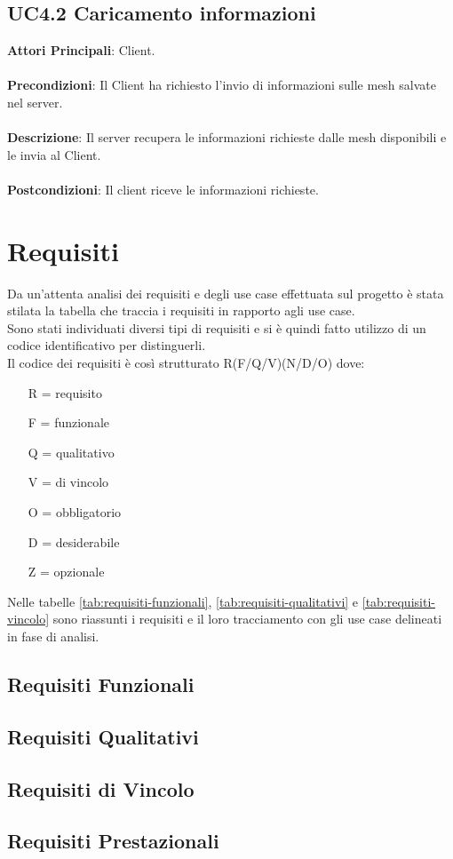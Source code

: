 \subsection{UC4.2 Caricamento informazioni}
\textbf{Attori Principali}: Client.
\\\\ \textbf{Precondizioni}: Il Client ha richiesto l'invio di informazioni sulle mesh salvate nel server.
\\\\ \textbf{Descrizione}: Il server recupera le informazioni richieste dalle mesh disponibili e le invia al Client.
\\\\ \textbf{Postcondizioni}: Il client riceve le informazioni richieste.


\section{Requisiti}

Da un'attenta analisi dei requisiti e degli use case effettuata sul progetto è stata stilata la tabella che traccia i requisiti in rapporto agli use case.\\
Sono stati individuati diversi tipi di requisiti e si è quindi fatto utilizzo di un codice identificativo per distinguerli.\\
Il codice dei requisiti è così strutturato R(F/Q/V)(N/D/O) dove:
\begin{enumerate}
	\item[R =] requisito
    \item[F =] funzionale
    \item[Q =] qualitativo
    \item[V =] di vincolo
    \item[O =] obbligatorio
    \item[D =] desiderabile
    \item[Z =] opzionale
\end{enumerate}
Nelle tabelle \ref{tab:requisiti-funzionali}, \ref{tab:requisiti-qualitativi} e \ref{tab:requisiti-vincolo} sono riassunti i requisiti e il loro tracciamento con gli use case delineati in fase di analisi.

\subsection{Requisiti Funzionali}

\subsection{Requisiti Qualitativi}

\subsection{Requisiti di Vincolo}

\subsection{Requisiti Prestazionali}
